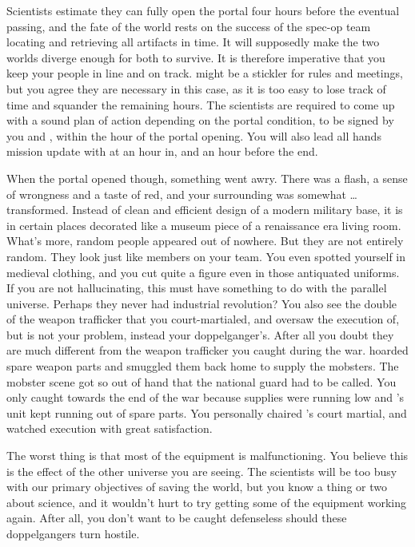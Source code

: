 \documentclass[char]{guildcamp3}
\begin{document}
Scientists estimate they can fully open the portal four hours before the eventual passing, and the fate of the world rests on the success of the spec-op team locating and retrieving all artifacts in time. It will supposedly make the two worlds diverge enough for both to survive. It is therefore imperative that you keep your people in line and on track. \cPoliOne{} might be a stickler for rules and meetings, but you agree they are necessary in this case, as it is too easy to lose track of time and squander the remaining hours. The scientists are required to come up with a sound plan of action depending on the portal condition, to be signed by you and \cPoliOne{}, within the hour of the portal opening. You will also lead all hands mission update with \cPoliOne{} at an hour in, and an hour before the end. 

When the portal opened though, something went awry. There was a flash, a sense of wrongness and a taste of red, and your surrounding was somewhat \ldots transformed. Instead of clean and efficient design of a modern military base, it is in certain places decorated like a museum piece of a renaissance era living room. What's more, random people appeared out of nowhere. But they are not entirely random. They look just like members on your team. You even spotted yourself in medieval clothing, and you cut quite a figure even in those antiquated uniforms. If you are not hallucinating, this must have something to do with the parallel universe. Perhaps they never had industrial revolution? You also see the double of the weapon trafficker that you court-martialed, and oversaw the execution of, but \cRogueOne{\they} is not your problem, instead your doppelganger's. After all you doubt they are much different from the weapon trafficker you caught during the war. \cRogueOne{\intro} hoarded spare weapon parts and smuggled them back home to supply the mobsters. The mobster scene got so out of hand that the national guard had to be called. You only caught \cRogueOne{} towards the end of the war because supplies were running low and \cRogueOne{}'s unit kept running out of spare parts. You personally chaired \cRogueOne{}'s court martial, and watched  execution with great satisfaction.

The worst thing is that most of the equipment is malfunctioning. You believe this is the effect of the other universe you are seeing. The scientists will be too busy with our primary objectives of saving the world, but you know a thing or two about science, and it wouldn't hurt to try getting some of the equipment working again. After all, you don't want to be caught defenseless should these doppelgangers turn hostile.
\end{document}
